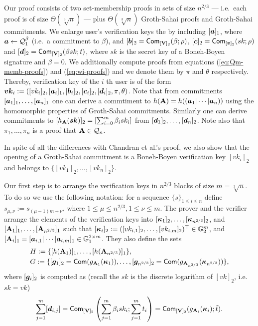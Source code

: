 Our proof consists of two set-membership proofs in sets of size $n^{2/3}$ --- i.e.~each proof is of size $\Theta(\sqrt[3]{n})$ ---  plus $\Theta(\sqrt[3]{n})$ Groth-Sahai proofs and Groth-Sahai commitments.
We enlarge user's verification keys the by including $[{\boldsymbol{a}}]_1$, where ${\boldsymbol{a}}\gets\mathcal{Q}_1^\beta$ (i.e.~a commitment to $\beta$), and $[{\boldsymbol{b}}]_2=\mathsf{Com}_{[\mathbf{{V}}]_2}(\beta;\rho)$, $[{\boldsymbol{c}}]_2=\mathsf{Com}_{[{\boldsymbol{v}}]_2}(sk;\rho)$ and $[{\boldsymbol{d}}]_2 = \mathsf{Com}_{[\mathbf{{V}}]_2}(\beta sk;t)$, where $sk$ is the secret key of a Boneh-Boyen signature and $\beta=0$. We additionally compute proofs from equations (\ref{eq:Qm-memb-proofs}) and (\ref{eq:wi-proofs}) and we denote them by $\pi$ and $\theta$ respectively. Thereby, verification key of the $i$ th user is of the form ${\boldsymbol{vk}}_i:=([vk_i]_2,[{\boldsymbol{a}}_i]_1,[{\boldsymbol{b}}_i]_2,[{\boldsymbol{c}}_i]_2,[{\boldsymbol{d}}_i]_2,\pi,\theta)$. Note that from commitments $[{\boldsymbol{a}}_1]_1,\ldots,[{\boldsymbol{a}}_n]_1$ one can derive a commtiment to $h(\mathbf{{A}})=h(({\boldsymbol{a}}_1|\cdots|{\boldsymbol{a}}_n))$ using the homomorphic properties of Groth-Sahai commitments. Similarly one can derive commitments to $[h_{\mathbf{{A}}}({\boldsymbol{sk}})]_2 = [\sum_{i=0}^m\beta_i sk_i]$ from $[{\boldsymbol{d}}_1]_2,\ldots,[{\boldsymbol{d}}_n]_2$. Note also that $\pi_1,\ldots,\pi_n$ is a proof that $\mathbf{{A}}\in\mathcal{Q}_n$.

In spite of all the differences with Chandran et al.'s proof, we also show that the opening of a Groth-Sahai commitment is a Boneh-Boyen verification key $[vk_i]_2$ and belongs to $\{[vk_1]_2,\ldots,[vk_n]_2\}$.

Our first step is to arrange the verification keys in $n^{2/3}$ blocks of size $m=\sqrt[3]{n}$. To do so we use the following notation: for a sequence $\{s\}_{1\leq i \leq n}$ define $s_{\mu,\nu}:=s_{(\mu-1)m+\nu}$, where  $1\leq\mu\leq n^{2/3},1\leq \nu\leq m$.  The prover and the verifier arrange the elements of the verification keys into $[{\boldsymbol{\kappa}}_1]_2,\ldots, [{\boldsymbol{\kappa}}_{n^{2/3}}]_2$, and $[\mathbf{{A}}_1]_1,\ldots, [\mathbf{{A}}_{n^{2/3}}]_1$ such that $[{\boldsymbol{\kappa}}_i]_2:= ([vk_{i,1}]_2,\ldots,[vk_{i,m}]_2)^\top\in\mathbb{G}^m_2$,  and $[\mathbf{{A}}_i]_1=[{\boldsymbol{a}}_{i,1}|\cdots|{\boldsymbol{a}}_{i,m}]_1\in\mathbb{G}^{2\times m}_1$. They also define the sets
\begin{align*}
&H:=\{[h(\mathbf{{A}}_1)]_1,\ldots,\allowbreak [h(\mathbf{{A}}_{n^{2/3}})]_1\},\\
&G:=\{[{\boldsymbol{g}}_1]_2 = \mathsf{Com}(g_{\mathbf{{A}}_1}({\boldsymbol{\kappa}}_1)),\ldots,[{\boldsymbol{g}}_{n^{2/3}}]_2 = \mathsf{Com}(g_{\mathbf{{A}}_{n^{2/3}}}({\boldsymbol{\kappa}}_{n^{2/3}}))\},
\end{align*}
where $[{\boldsymbol{g}}_i]_2$ is computed as (recall the $sk$ is the discrete logarithm of $[vk]_2$, i.e.~$sk=vk$)
$$\sum_{j=1}^m [{\boldsymbol{d}}_{i,j}]=\allowbreak\mathsf{Com}_{[\mathbf{{V}}]_2}\left(\sum_{j=1}^m\beta_isk_i;\sum_{j=1}^m t_i\right)=\allowbreak \mathsf{Com}_{[\mathbf{{V}}]_2}(g_{\mathbf{{A}}_i}({\boldsymbol{\kappa}}_i);\tilde{t}).$$

